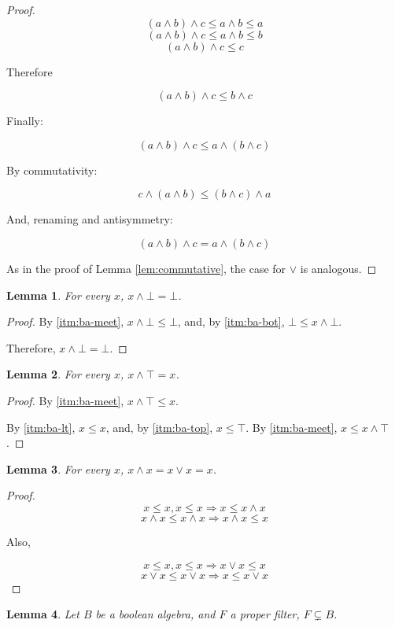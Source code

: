\documentclass[notitlepage,a4paper]{article}
\newtheorem{lemma}{Lemma}
\begin{document}
\begin{enumerate}
\begin{proof}
       $$(a ∧ b) ∧ c ≤ a ∧ b ≤ a$$ %
       $$(a ∧ b) ∧ c ≤ a ∧ b ≤ b$$ %
       $$(a ∧ b) ∧ c ≤ c$$         %

       Therefore

       $$(a ∧ b) ∧ c ≤ b ∧ c$$

       Finally:

       $$(a ∧ b) ∧ c ≤ a ∧ (b ∧ c)$$

       By commutativity:

       $$c ∧ (a ∧ b) ≤ (b ∧ c) ∧ a$$

       And, renaming and antisymmetry:

       $$(a ∧ b) ∧ c = a ∧ (b ∧ c)$$

       As in the proof of Lemma \ref{lem:commutative}, the case for $∨$ is
       analogous.
       
     \end{proof}

     \begin{lemma}\label{lem:bot-meet}
       For every $x$, $x ∧ ⊥ = ⊥$.
     \end{lemma}
     \begin{proof}
       By \ref{itm:ba-meet}, $x ∧ ⊥ ≤ ⊥$, and,
       by \ref{itm:ba-bot}, $⊥ ≤ x ∧ ⊥$.

       Therefore, $x ∧ ⊥ = ⊥$.
     \end{proof}

     \begin{lemma}\label{lem:top-meet}
       For every $x$, $x ∧ ⊤ = x$.
     \end{lemma}
     \begin{proof}
       By \ref{itm:ba-meet}, $x ∧ ⊤ ≤ x$.

       By \ref{itm:ba-lt}, $x ≤ x$, and, by \ref{itm:ba-top}, $x ≤ ⊤$.
       By \ref{itm:ba-meet}, $x ≤ x ∧ ⊤$.
     \end{proof}
     
     \begin{lemma}\label{lem:self}
       For every $x$, $x ∧ x = x ∨ x = x$.
     \end{lemma}
     \begin{proof}
       $$ x ≤ x, x ≤ x ⇒ x ≤ x ∧ x$$
       $$ x ∧ x ≤ x ∧ x ⇒ x ∧ x ≤ x$$

       Also,

       $$ x ≤ x, x ≤ x ⇒ x ∨ x ≤ x$$
       $$ x ∨ x ≤ x ∨ x ⇒ x ≤ x ∨ x$$
     \end{proof}

     \begin{lemma}\label{lem:filter-ext}
       Let $B$ be a boolean algebra, and $F$ a proper filter, $F \subsetneq B$.
       

\end{lemma}
\end{enumerate}
\end{document}
